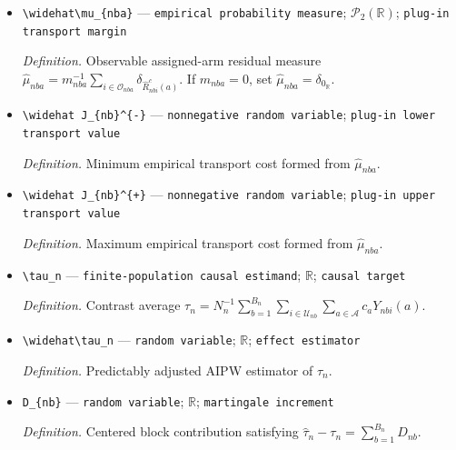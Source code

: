 \documentclass{article}
\begin{document}
\begin{itemize}
  \par\smallskip\noindent\emph{Definition.} Observable variance \(\widehat S_{nba}^2=(m_{nba}-1)^{-1}\sum_{i\in\mathcal O_{nba}}\{\widehat R_{nbi}^{c}(a)\}^2\) when \(m_{nba}\ge2\), with value zero when \(m_{nba}\le1\).
  \item \texttt{\textbackslash{}\allowbreak{}widehat\textbackslash{}\allowbreak{}mu\_\allowbreak{}\{nba\}\allowbreak{}} --- \texttt{empirical probability measure}; \(\mathcal P_2(\mathbb R)\); \texttt{plug-\allowbreak{}in transport margin}
  \par\smallskip\noindent\emph{Definition.} Observable assigned-arm residual measure \(\widehat\mu_{nba}=m_{nba}^{-1}\sum_{i\in\mathcal O_{nba}}\delta_{\widehat R_{nbi}^{c}(a)}\). If \(m_{nba}=0\), set \(\widehat\mu_{nba}=\delta_{0_{\mathbb R}}\).
  \item \texttt{\textbackslash{}\allowbreak{}widehat J\_\allowbreak{}\{nb\}\allowbreak{}\textasciicircum{}\{-\allowbreak{}\}\allowbreak{}} --- \texttt{nonnegative random variable}; \texttt{plug-\allowbreak{}in lower transport value}
  \par\smallskip\noindent\emph{Definition.} Minimum empirical transport cost formed from \(\widehat\mu_{nba}\).
  \item \texttt{\textbackslash{}\allowbreak{}widehat J\_\allowbreak{}\{nb\}\allowbreak{}\textasciicircum{}\{+\allowbreak{}\}\allowbreak{}} --- \texttt{nonnegative random variable}; \texttt{plug-\allowbreak{}in upper transport value}
  \par\smallskip\noindent\emph{Definition.} Maximum empirical transport cost formed from \(\widehat\mu_{nba}\).
  \item \texttt{\textbackslash{}\allowbreak{}tau\_\allowbreak{}n} --- \texttt{finite-\allowbreak{}population causal estimand}; \(\mathbb R\); \texttt{causal target}
  \par\smallskip\noindent\emph{Definition.} Contrast average \(\tau_n=N_n^{-1}\sum_{b=1}^{B_n}\sum_{i\in\mathcal U_{nb}}\sum_{a\in\mathcal A}c_aY_{nbi}(a)\).
  \item \texttt{\textbackslash{}\allowbreak{}widehat\textbackslash{}\allowbreak{}tau\_\allowbreak{}n} --- \texttt{random variable}; \(\mathbb R\); \texttt{effect estimator}
  \par\smallskip\noindent\emph{Definition.} Predictably adjusted AIPW estimator of \(\tau_n\).
  \item \texttt{D\_\allowbreak{}\{nb\}\allowbreak{}} --- \texttt{random variable}; \(\mathbb R\); \texttt{martingale increment}
  \par\smallskip\noindent\emph{Definition.} Centered block contribution satisfying \(\widehat\tau_n-\tau_n=\sum_{b=1}^{B_n}D_{nb}\).

\end{itemize}
\end{document}
